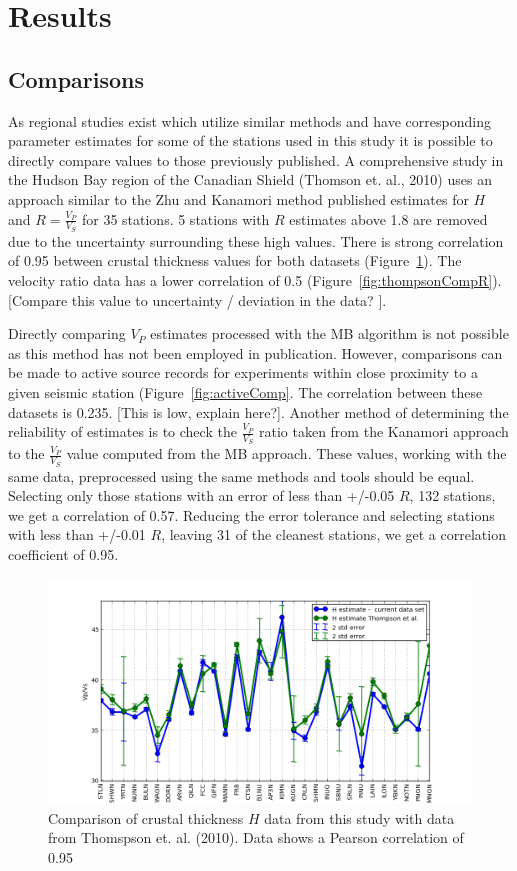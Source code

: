 \documentclass[draft, 12pt]{article}
\begin{document}
\section{Results}

\subsection{Comparisons}
As regional studies exist which utilize similar methods and have corresponding parameter estimates for some of the stations used in this study it is possible to directly compare values to those previously published. A comprehensive study in the Hudson Bay region of the Canadian Shield (Thomson et. al., 2010) uses an approach similar to the Zhu and Kanamori method published estimates for $H$ and $R=\frac{V_P}{V_S}$ for 35 stations. 5 stations with $R$ estimates above 1.8 are removed due to the uncertainty surrounding these high values. There is strong correlation of 0.95 between crustal thickness values for both datasets (Figure~\ref{fig:thompsonCompH}). The velocity ratio data has a lower correlation of 0.5 (Figure~\ref{fig:thompsonCompR}). [Compare this value to uncertainty / deviation in the data? ].

Directly comparing $V_P$ estimates processed with the MB algorithm is not possible as this method has not been employed in publication. However, comparisons can be made to active source records for experiments within close proximity to a given seismic station (Figure~\ref{fig:activeComp}. The correlation between these datasets is 0.235. [This is low, explain here?]. Another method of determining the reliability of estimates is to check the $\frac{V_P}{V_S}$ ratio taken from the Kanamori approach to the $\frac{V_P}{V_S}$ value computed from the MB approach. These values, working with the same data, preprocessed using the same methods and tools should be equal. Selecting only those stations with an error of less than +/-0.05 $R$, 132 stations, we get a correlation of 0.57. Reducing the error tolerance and selecting stations with less than +/-0.01 $R$, leaving 31 of the cleanest stations, we get a correlation coefficient of 0.95.

\begin{figure}
  \centering
    \includegraphics[width=\textwidth]{thompsonComparisonH}
  \caption{Comparison of crustal thickness $H$ data from this study with data from Thomspson et. al. (2010). Data shows a Pearson correlation of 0.95}
  \label{fig:thompsonCompH}
\end{figure}
\end{document}
